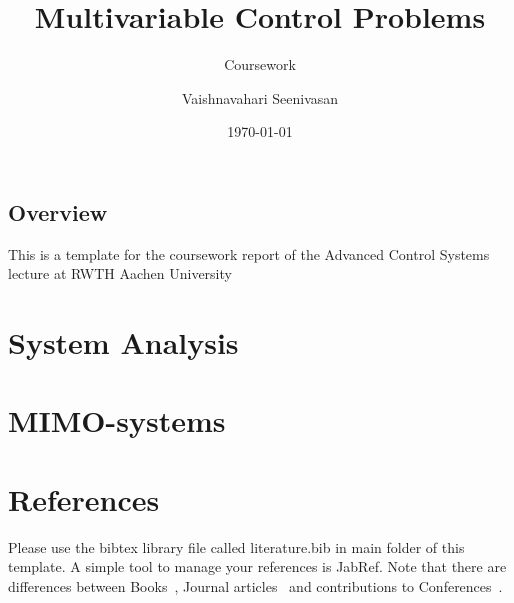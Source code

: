 \documentclass{scrreprt}
\title{Multivariable Control Problems}
\author{Vaishnavahari Seenivasan}
\date{\today}
\subtitle{Coursework}
\begin{document}
\maketitle

\tableofcontents 

\cleardoublepage

\pagestyle{plain}


\section{Overview}
This is a template for the coursework report of the Advanced Control Systems lecture at RWTH Aachen University

\chapter{System Analysis}


\chapter{MIMO-systems}




\chapter{References}
Please use the bibtex library file called literature.bib in main folder of this template. A simple tool to manage your references is JabRef. Note that there are differences between Books~\cite{Sko05}, Journal articles~\cite{Rue14} and contributions to Conferences~\cite{Mis13}.






\end{document}
